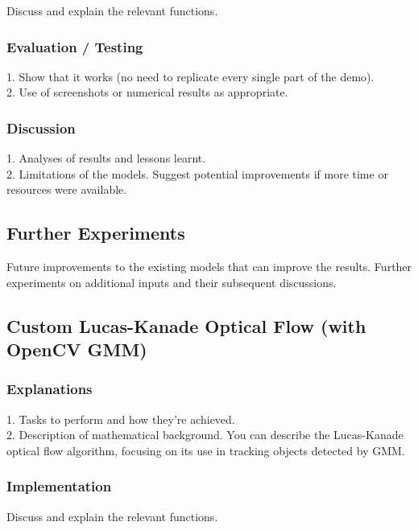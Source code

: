 \documentclass[10pt,twocolumn,letterpaper]{article}
\begin{document}
Discuss and explain the relevant functions.

\subsubsection{Evaluation / Testing}
1. Show that it works (no need to replicate every single part of the demo). \\
2. Use of screenshots or numerical results as appropriate.

\subsubsection{Discussion}
1. Analyses of results and lessons learnt. \\
2. Limitations of the models. Suggest potential improvements if more time or resources were available.

\subsection{Further Experiments}
Future improvements to the existing models that can improve the results. Further experiments on additional inputs and their subsequent discussions.

\subsection{Custom Lucas-Kanade Optical Flow (with OpenCV GMM)}

\subsubsection{Explanations}
1. Tasks to perform and how they're achieved. \\
2. Description of mathematical background. You can describe the Lucas-Kanade optical flow algorithm, focusing on its use in tracking objects detected by GMM.

\subsubsection{Implementation}
Discuss and explain the relevant functions.
\end{document}
